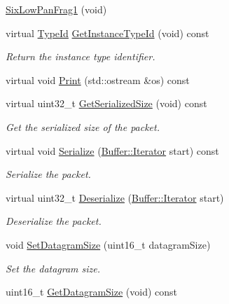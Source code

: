 \begin{DoxyCompactItemize}
\item 
\hyperlink{classns3_1_1SixLowPanFrag1_a4d4f860ca96cba3d88142beafc08eb1b}{Six\+Low\+Pan\+Frag1} (void)
\item 
virtual \hyperlink{classns3_1_1TypeId}{Type\+Id} \hyperlink{classns3_1_1SixLowPanFrag1_ac89dcf14d85837b9f02408783c9d3065}{Get\+Instance\+Type\+Id} (void) const 
\begin{DoxyCompactList}\small\item\em Return the instance type identifier. \end{DoxyCompactList}\item 
virtual void \hyperlink{classns3_1_1SixLowPanFrag1_a05e0ce15b55cb8a008669f32837439b0}{Print} (std\+::ostream \&os) const 
\item 
virtual uint32\+\_\+t \hyperlink{classns3_1_1SixLowPanFrag1_a30bd2c4c1cc6e01ebf68a4cd93971169}{Get\+Serialized\+Size} (void) const 
\begin{DoxyCompactList}\small\item\em Get the serialized size of the packet. \end{DoxyCompactList}\item 
virtual void \hyperlink{classns3_1_1SixLowPanFrag1_a3d9c59f94c9b7afb29c2d0c404d850e4}{Serialize} (\hyperlink{classns3_1_1Buffer_1_1Iterator}{Buffer\+::\+Iterator} start) const 
\begin{DoxyCompactList}\small\item\em Serialize the packet. \end{DoxyCompactList}\item 
virtual uint32\+\_\+t \hyperlink{classns3_1_1SixLowPanFrag1_aaa54f9e3bf0d226fe835c0cabcc41001}{Deserialize} (\hyperlink{classns3_1_1Buffer_1_1Iterator}{Buffer\+::\+Iterator} start)
\begin{DoxyCompactList}\small\item\em Deserialize the packet. \end{DoxyCompactList}\item 
void \hyperlink{classns3_1_1SixLowPanFrag1_a418bc430f0c843f26f7fd98a82bdec15}{Set\+Datagram\+Size} (uint16\+\_\+t datagram\+Size)
\begin{DoxyCompactList}\small\item\em Set the datagram size. \end{DoxyCompactList}\item 
uint16\+\_\+t \hyperlink{classns3_1_1SixLowPanFrag1_ab42ff1ddeddff9e200982ca51ecdad2d}{Get\+Datagram\+Size} (void) const 

\end{DoxyCompactItemize}
